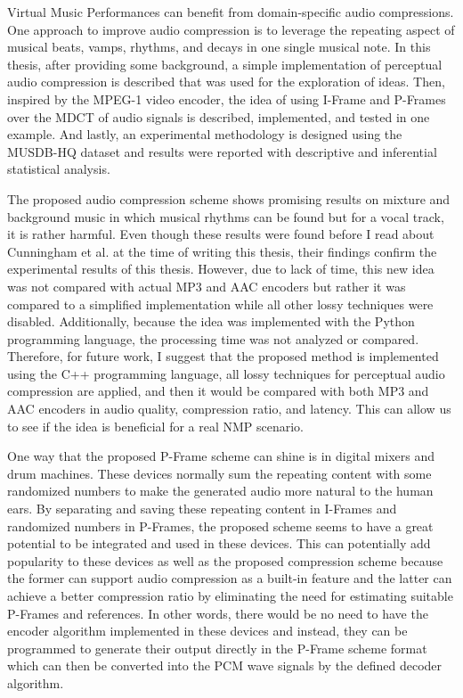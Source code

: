\label{chapter:concl}

Virtual Music Performances can benefit from domain-specific audio compressions. One approach to improve audio compression is to leverage the repeating aspect of musical beats, vamps, rhythms, and decays in one single musical note. In this thesis, after providing some background, a simple implementation of perceptual audio compression is described that was used for the exploration of ideas. Then, inspired by the MPEG-1 video encoder, the idea of using I-Frame and P-Frames over the MDCT of audio signals is described, implemented, and tested in one example. And lastly, an experimental methodology is designed using the MUSDB-HQ dataset and results were reported with descriptive and inferential statistical analysis.

The proposed audio compression scheme shows promising results on mixture and background music in which musical rhythms can be found but for a vocal track, it is rather harmful. Even though these results were found before I read about Cunningham et al. at the time of writing this thesis, their findings confirm the experimental results of this thesis. However, due to lack of time, this new idea was not compared with actual MP3 and AAC encoders but rather it was compared to a simplified implementation while all other lossy techniques were disabled. Additionally, because the idea was implemented with the Python programming language, the processing time was not analyzed or compared. Therefore, for future work, I suggest that the proposed method is implemented using the C++ programming language, all lossy techniques for perceptual audio compression are applied, and then it would be compared with both MP3 and AAC encoders in audio quality, compression ratio, and latency. This can allow us to see if the idea is beneficial for a real NMP scenario.

One way that the proposed P-Frame scheme can shine is in digital mixers and drum machines. These devices normally sum the repeating content with some randomized numbers to make the generated audio more natural to the human ears. By separating and saving these repeating content in I-Frames and randomized numbers in P-Frames, the proposed scheme seems to have a great potential to be integrated and used in these devices. This can potentially add popularity to these devices as well as the proposed compression scheme because the former can support audio compression as a built-in feature and the latter can achieve a better compression ratio by eliminating the need for estimating suitable P-Frames and references. In other words, there would be no need to have the encoder algorithm implemented in these devices and instead, they can be programmed to generate their output directly in the P-Frame scheme format which can then be converted into the PCM wave signals by the defined decoder algorithm.

